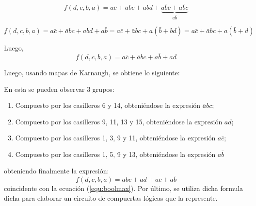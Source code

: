 \documentclass[a4paper]{article}
\begin{document}
\begin{center}
\[
	f \left( d,c,b,a \right) = a\bar{c} + \bar{a}bc + abd + \underbrace{a\bar{b}\bar{c} + a\bar{b}c}_{a\bar{b}}
\]

\[
	f \left( d,c,b,a \right) = a\bar{c} + \bar{a}bc + abd + a\bar{b} = a\bar{c} + \bar{a}bc + a \left( \bar{b} + bd \right) = a\bar{c} + \bar{a}bc + a \left( \bar{b} + d \right)
\]

Luego,
\begin{equation}
f \left( d,c,b,a \right) = a\bar{c} + \bar{a}bc + a\bar{b} + ad
	\label{equ:boolmax}
\end{equation}

Luego, usando mapas de Karnaugh, se obtiene lo siguiente:

\end{center}


En esta se pueden observar 3 grupos:
\begin{enumerate}
	\item Compuesto por los casilleros 6 y 14, obteniéndose la expresión $ \bar{a} b c $;
	\item Compuesto por los casilleros 9, 11, 13 y 15, obteniéndose la expresión $ a d $;
	\item Compuesto por los casilleros 1, 3, 9 y 11, obteniéndose la expresión $ a \bar{c}$;
	\item Compuesto por los casilleros 1, 5, 9 y 13, obteniéndose la expresión $ a \bar{b} $
\end{enumerate}
obteniendo finalmente la expresión: 
\begin{equation}
	f \left( d,c,b,a \right) = \bar{a} b c + a d + a \bar{c} + a \bar{b}
	\label{equ:k2}
\end{equation}
coincidente con la ecuación	(\ref{equ:boolmax}). Por último, se utiliza dicha formula dicha para elaborar un circuito de compuertas lógicas que la represente.
\end{document}
